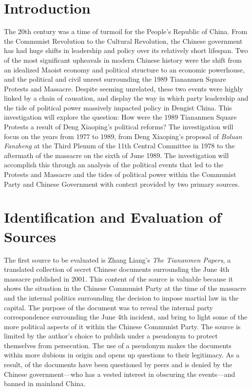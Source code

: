 \documentclass{paper}
\newcommand{\researchquestion}{How were the 1989 Tiananmen Square Protests a result of Deng Xiaoping's political reforms?}
\begin{document}
\insertTitlePage
\tableofcontents
\thispagestyle{empty}
\newpage
\setcounter{page}{1}
\doublespacing
\justifying

\section{Introduction}
The 20th century was a time of turmoil for the People's Republic of China.
From the Communist Revolution to the Cultural Revolution, the Chinese government has had huge shifts in leadership and policy over its relatively short lifespan.
Two of the most significant upheavals in modern Chinese history were the shift from an idealized Maoist economy and political structure to an economic powerhouse, and the political and civil unrest surrounding the 1989 Tiananmen Square Protests and Massacre.
Despite seeming unrelated, these two events were highly linked by a chain of causation, and display the way in which party leadership and the tide of political power massively impacted policy in Dengist China.
This investigation will explore the question: \researchquestion
The investigation will focus on the years from 1977 to 1989, from Deng Xiaoping's proposal of \emph{Boluan Fanzheng} at the Third Plenum of the 11th Central Committee in 1978 to the aftermath of the massacre on the sixth of June 1989.
The investigation will accomplish this through an analysis of the political events that led to the Protests and Massacre and the tides of political power within the Communist Party and Chinese Government with context provided by two primary sources.

\section{Identification and Evaluation of Sources}
The first source to be evaluated is Zhang Liang's \textit{The Tiananmen Papers},\autocite{tiananmen} a translated collection of secret Chinese documents surrounding the June 4th massacre published in 2001.
This content of the source is valuable because it shows the situation in the Chinese Communist Party at the time of the massacre and the internal politics surrounding the decision to impose martial law in the capital.
The purpose of the document was to reveal the internal party correspondence surrounding the June 4th incident, and bring to light some of the more political aspects of it within the Chinese Communist Party.
The source is limited by the author's choice to publish under a pseudonym to protect themselves from persecution.
The use of a pseudonym makes the documents within more dubious in origin and opens up questions to their legitimacy.
As a result, of the documents have been questioned by peers and is denied by the Chinese government---who has a vested interest in obscuring the events---and banned in mainland China.
\end{document}
